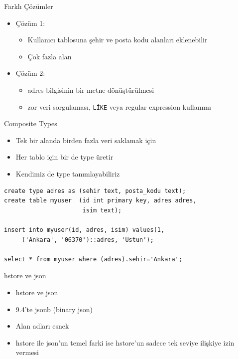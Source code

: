 \documentclass[presentation]{beamer}
\begin{document}
\begin{frame}[fragile,label=sec-22]{Farklı Çözümler}
 \begin{itemize}
\item Çözüm 1:
\begin{itemize}
\item Kullanıcı tablosuna şehir ve posta kodu alanları eklenebilir
\item Çok fazla alan
\end{itemize}
\item Çözüm 2:
\begin{itemize}
\item adres bilgisinin bir metne dönüştürülmesi
\item zor veri sorgulaması, \texttt{LİKE} veya regular expression kullanımı
\end{itemize}
\end{itemize}
\end{frame}

\begin{frame}[fragile,label=sec-23]{Composite Types}
 \begin{itemize}
\item Tek bir alanda birden fazla veri saklamak için
\item Her tablo için bir de type üretir
\item Kendimiz de type tanımlayabiliriz
\end{itemize}

\begin{verbatim}
create type adres as (sehir text, posta_kodu text);
create table myuser  (id int primary key, adres adres,
                      isim text);

insert into myuser(id, adres, isim) values(1,
     ('Ankara', '06370')::adres, 'Ustun');

select * from myuser where (adres).sehir='Ankara';
\end{verbatim}
\end{frame}

\begin{frame}[label=sec-24]{hstore ve json}
\begin{itemize}
\item hstore ve json
\item 9.4'te jsonb (binary json)
\item Alan adları esnek
\item hstore ile json'un temel farki ise hstore'un sadece tek seviye ilişkiye izin
vermesi
\end{itemize}
\end{frame}
\end{document}
